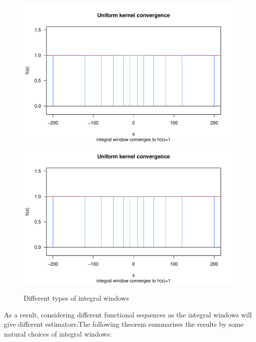 \documentclass[%
 reprint,
 amsmath,amssymb,
 aps,
]{revtex4-2}
\begin{document}
\begin{figure}
    \centering
    \includegraphics[page = 1, scale = 0.45]{figures/integralwindow.pdf}
    \includegraphics[page = 2, scale = 0.45]{figures/integralwindow.pdf}
    \caption{Different types of integral windows}
    \label{fig:FI integral windows}
\end{figure}

As a result, considering different functional sequences as the integral windows will give different estimators.The following theorem summarises the results by some natural choices of integral windows:
\end{document}
